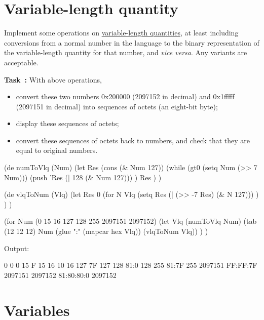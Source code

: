 \pagebreak{}
\section*{Variable-length quantity}

Implement some operations on
\href{http://en.wikipedia.org/wiki/Variable-length\_quantity}{variable-length
quantities}, at least including conversions from a normal number in the
language to the binary representation of the variable-length quantity
for that number, and \emph{vice versa}. Any variants are acceptable.

\textbf{Task~:} With above operations,

\begin{itemize}
\item
  convert these two numbers 0x200000 (2097152 in decimal) and 0x1fffff
  (2097151 in decimal) into sequences of octets (an eight-bit byte);
\item
  display these sequences of octets;
\item
  convert these sequences of octets back to numbers, and check that they
  are equal to original numbers.
\end{itemize}


\begin{wideverbatim}

(de numToVlq (Num)
   (let Res (cons (\& Num 127))
      (while (gt0 (setq Num (>> 7 Num)))
         (push 'Res (| 128 (\& Num 127))) )
      Res ) )

(de vlqToNum (Vlq)
   (let Res 0
      (for N Vlq
         (setq Res (| (>> -7 Res) (\& N 127))) ) ) )

(for Num (0 15 16 127 128 255 2097151 2097152)
   (let Vlq (numToVlq Num)
      (tab (12 12 12) Num (glue ":" (mapcar hex Vlq)) (vlqToNum Vlq)) ) )

Output:

           0           0           0
          15           F          15
          16          10          16
         127          7F         127
         128        81:0         128
         255       81:7F         255
     2097151    FF:FF:7F     2097151
     2097152  81:80:80:0     2097152

\end{wideverbatim}

\pagebreak{}
\section*{Variables}


